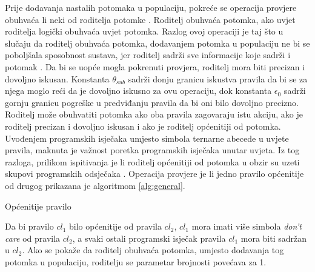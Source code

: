 \documentclass[times, utf8, zavrsni]{fer}
\begin{document}
Prije dodavanja nastalih potomaka u populaciju, pokreće se operacija provjere obuhvaća li neki od roditelja potomke .
Roditelj obuhvaća potomka, ako uvjet roditelja logički obuhvaća uvjet potomka.
Razlog ovoj operaciji je taj što u slučaju da roditelj obuhvaća potomka, dodavanjem potomka u populaciju ne bi se poboljšala sposobnost sustava, jer roditelj sadrži sve informacije koje sadrži i potomak \citep{1}.
Da bi se uopće mogla pokrenuti provjera, roditelj mora biti precizan i dovoljno iskusan.
Konstanta $\theta_{sub}$ sadrži donju granicu iskustva pravila da bi se za njega moglo reći da je dovoljno iskusno za ovu operaciju, dok konstanta $\epsilon_{0}$ sadrži gornju granicu pogreške u predviđanju pravila da bi oni bilo dovoljno precizno.
Roditelj može obuhvatiti potomka ako oba pravila zagovaraju istu akciju, ako je roditelj precizan i dovoljno iskusan i ako je roditelj općenitiji od potomka.
Uvođenjem programskih isječaka umjesto simbola ternarne abecede u uvjete pravila, maknuta je važnost poretka programskih isječaka unutar uvjeta.
Iz tog razloga, prilikom ispitivanja je li roditelj općenitiji od potomka u obzir su uzeti skupovi programskih odsječaka \citep{4}.
Operacija provjere je li jedno pravilo općenitije od drugog prikazana je algoritmom \ref{alg:general}.
\begin{algorithm}
    \caption{Općenitije pravilo}
    \label{alg:general}
    \begin{algorithmic}
        \ENDIF
        \ENDIF
    \end{algorithmic}
\end{algorithm}
Da bi pravilo $cl_{1}$ bilo općenitije od pravila $cl_{2}$, $cl_{1}$ mora imati više simbola \emph{don't care} od pravila $cl_{2}$, a svaki ostali programski isječak pravila $cl_{1}$ mora biti sadržan u $cl_{2}$.
Ako se pokaže da roditelj obuhvaća potomka, umjesto dodavanja tog potomka u populaciju, roditelju se parametar brojnosti povećava za 1.
\end{document}

